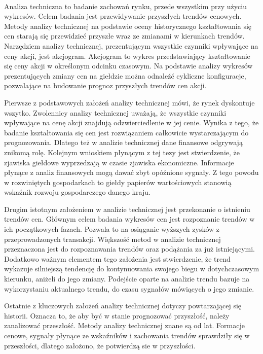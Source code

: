 \documentclass[pdflatex,11pt]{aghdpl}
\begin{document}
\paragraph{}
Analiza techniczna to badanie zachowań rynku, przede wszystkim przy użyciu wykresów. Celem badania jest przewidywanie przyszłych trendów cenowych\cite{5}. Metody analizy technicznej na podstawie oceny historycznego kształtowania się cen starają się przewidzieć przyszłe wraz ze zmianami w kierunkach trendów. Narzędziem analizy technicznej, prezentującym wszystkie czynniki wpływające na ceny akcji, jest akcjogram. Akcjogram to wykres przedstawiający kształtowanie się ceny akcji w określonym odcinku czasowym. Na podstawie analizy wykresów prezentujących zmiany cen na giełdzie można odnaleźć cykliczne konfiguracje, pozwalające na budowanie prognoz przyszłych trendów cen akcji. 

Pierwsze z podstawowych założeń analizy technicznej mówi, że rynek dyskontuje wszytko. Zwolennicy analizy technicznej uważają, że wszystkie czynniki wpływające na cenę akcji znajdują odzwierciedlenie w jej cenie\cite{5}. Wynika z tego, że badanie kształtowania się cen jest rozwiązaniem całkowicie wystarczającym do prognozowania. Dlatego też w analizie technicznej dane finansowe odgrywają znikomą rolę. Kolejnym wnioskiem płynącym z tej tezy jest stwierdzenie, że zjawiska giełdowe wyprzedzają w czasie zjawiska ekonomiczne. Informacje płynące z analiz finansowych mogą dawać zbyt opóźnione sygnały. Z tego powodu w rozwiniętych gospodarkach to giełdy papierów wartościowych stanowią wskaźnik rozwoju gospodarczego danego kraju.

Drugim istotnym założeniem w analizie technicznej jest przekonanie o istnieniu trendów cen. Głównym celem badania wykresów cen jest rozpoznanie trendów w ich początkowych fazach. Pozwala to na osiąganie wyższych zysków z przeprowadzonych transakcji. Większość metod w analizie technicznej przeznaczona jest do rozpoznawania trendów oraz podążania za już istniejącymi. Dodatkowo ważnym elementem tego założenia jest stwierdzenie, że trend wykazuje silniejszą tendencję do kontynuowania swojego biegu w dotychczasowym kierunku, aniżeli do jego zmiany\cite{5}. Podejście oparte na analizie trendu bazuje na wykorzystaniu aktualnego trendu, do czasu sygnałów mówiących o jego zmianie.

Ostatnie z kluczowych założeń analizy technicznej dotyczy powtarzającej się historii. Oznacza to, że aby być w stanie prognozować przyszłość, należy zanalizować przeszłość. Metody analizy technicznej znane są od lat. Formacje cenowe, sygnały płynące ze wskaźników i zachowania trendów sprawdziły się w przeszłości, dlatego założono, że potwierdzą sie w przyszłości\cite{5}. 
\end{document}
